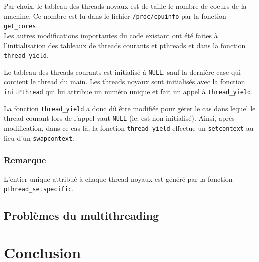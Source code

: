 \documentclass[a4paper,11pt]{article}
\begin{document}
Par choix, le tableau des threads noyaux est de taille le nombre de coeurs de la machine. Ce nombre est lu dans le fichier \texttt{/proc/cpuinfo} par la fonction \texttt{get\_cores}.\\

Les autres modifications importantes du code existant ont été faites à l'initialisation des tableaux de threads courants et pthreads et dans la fonction \texttt{thread\_yield}.

Le tableau des threads courants est initialisé à \texttt{NULL}, sauf la dernière case qui contient le thread du main. Les threads noyaux sont initialisés avec la fonction \texttt{initPthread} qui lui attribue un numéro unique et fait un appel à \texttt{thread\_yield}.

La fonction \texttt{thread\_yield} a donc dû être modifiée pour gérer le cas dans lequel le thread courant lors de l'appel vaut \texttt{NULL} (ie. est non initialisé). Ainsi, après modification, dans ce cas là, la fonction \texttt{thread\_yield} effectue un \texttt{setcontext} au lieu d'un \texttt{swapcontext}.

\subsubsection*{Remarque}

L'entier unique attribué à chaque thread noyaux est généré par la fonction \texttt{pthread\_setspecific}.

\subsection{Problèmes du multithreading}




\section*{Conclusion} %
\end{document}
